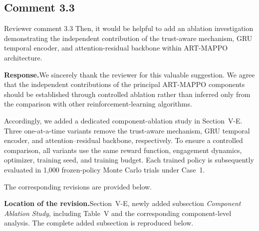 \documentclass[11pt]{article}
\newcommand{\rsp}{\medskip\noindent\textbf{Response.}\quad}
\newcommand{\loc}{\medskip\noindent\textbf{Location of the revision.}\quad}
\begin{document}
\subsection*{Comment 3.3}

\begin{reviewercomment}{Reviewer comment 3.3}
Then, it would be helpful to add an ablation investigation demonstrating
the independent contribution of the trust-aware mechanism, GRU temporal
encoder, and attention-residual backbone within ART-MAPPO architecture.
\end{reviewercomment}

\rsp We sincerely thank the reviewer for this valuable suggestion. We agree
that the independent contributions of the principal ART-MAPPO components
should be established through controlled ablation rather than inferred only
from the comparison with other reinforcement-learning algorithms.

Accordingly, we added a dedicated component-ablation study in Section~V-E.
Three one-at-a-time variants remove the trust-aware mechanism, GRU temporal
encoder, and attention--residual backbone, respectively. To ensure a
controlled comparison, all variants use the same reward function, engagement
dynamics, optimizer, training seed, and training budget. Each trained policy
is subsequently evaluated in 1,000 frozen-policy Monte Carlo trials under
Case~1.

The corresponding revisions are provided below.


\loc Section~V-E, newly added subsection \emph{Component Ablation Study},
including Table~V and the corresponding component-level analysis. The
complete added subsection is reproduced below.
\end{document}
